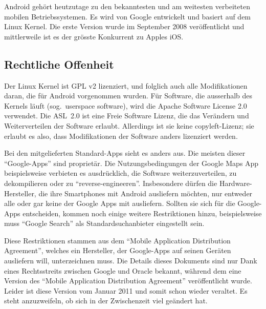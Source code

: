 Android gehört heutzutage zu den bekanntesten und am weitesten verbeiteten mobilen Betriebssystemen. Es wird von Google entwickelt und basiert auf dem Linux Kernel. Die erste Version wurde im September 2008 veröffentlicht und mittlerweile ist es der grösste Konkurrent zu Apples iOS.
\newline

\subsection{Rechtliche Offenheit}
Der Linux Kernel ist GPL v2 lizenziert\thinspace\cite{online:kernel-license}, und folglich auch alle Modifikationen daran, die für Android vorgenommen wurden. Für Software, die ausserhalb des Kernels läuft (sog.\ userspace software), wird die Apache Software License 2.0 verwendet\thinspace\cite{online:android-licenses}. Die \mbox{ASL 2.0} ist eine Freie Software Lizenz, die das Verändern und Weiterverteilen der Software erlaubt. Allerdings ist sie  keine copyleft-Lizenz; sie erlaubt es also, dass Modifikationen der Software anders lizenziert werden\thinspace\cite{online:apache-license}.

Bei den mitgelieferten Standard-Apps sieht es anders aus. Die meisten dieser ``Google-Apps'' sind proprietär. Die Nutzungsbedingungen der Google Maps App beispielsweise verbieten es ausdrücklich, die Software weiterzuverteilen, zu dekompilieren oder zu ``reverse-engineeren''\thinspace\cite{online:google-maps-tos}. Insbesondere dürfen die \mbox{Hardware-Hersteller}, die ihre Smartphones mit Android ausliefern möchten, nur entweder alle oder gar keine der Google Apps mit ausliefern. Sollten sie sich für die Google-Apps entscheiden, kommen noch einige weitere Restriktionen hinzu, beispielsweise muss ``Google Search'' als Standardsuchanbieter eingestellt sein\thinspace\cite{online:mada-leak}.

Diese Restriktionen stammen aus dem ``Mobile Application Distribution Agreement'', welches ein Hersteller, der Google-Apps auf seinen Geräten ausliefern will, unterzeichnen muss. Die Details dieses Dokuments sind nur Dank eines Rechtsstreits zwischen Google und Oracle bekannt, während dem eine Version des ``Mobile Application Distribution Agreement'' veröffentlicht wurde\thinspace\cite{online:ars-mada-leak}. Leider ist diese Version vom Januar 2011 und somit schon wieder veraltet. Es steht anzuzweifeln, ob sich in der Zwischenzeit viel geändert hat.
\newline

